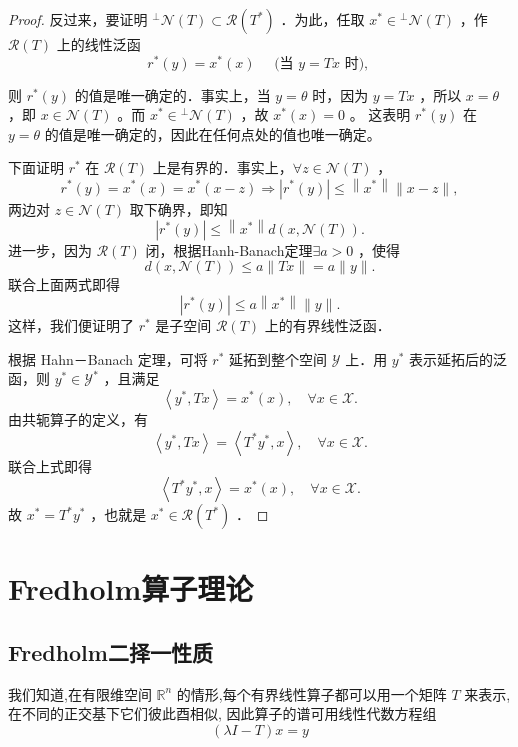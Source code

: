 \documentclass[lang=cn,newtx,10pt,scheme=chinese,thmcnt=chapter]{elegantbook}
\begin{document}
\begin{problemset}
\begin{proof}
反过来，要证明 ${ }^{\perp} \mathcal{N}(T) \subset \mathcal{R}\left(T^*\right)$ ．为此，任取 $x^* \in{ }^{\perp} \mathcal{N}(T)$ ，作 $\mathcal{R}(T)$ 上的线性泛函
$$
r^*(y)=x^*(x) \quad \text { (当 } y=T x \text { 时), }
$$


则 $r^*(y)$ 的值是唯一确定的．事实上，当 $y=\theta$ 时，因为 $y=T x$ ，所以 $x= \theta$ ，即 $x \in \mathcal{N}(T)$ 。而 $x^* \in{ }^{\perp} \mathcal{N}(T)$ ，故 $x^*(x)=0$ 。 这表明 $r^*(y)$ 在 $y=\theta$ 的值是唯一确定的，因此在任何点处的值也唯一确定。

下面证明 $r^*$ 在 $\mathcal{R}(T)$ 上是有界的．事实上，$\forall z \in \mathcal{N}(T)$ ，
$$
r^*(y)=x^*(x)=x^*(x-z) \Longrightarrow\left|r^*(y)\right| \leqslant\left\|x^*\right\|\|x-z\|,
$$
两边对 $z \in \mathcal{N}(T)$ 取下确界，即知
$$
\left|r^*(y)\right| \leqslant\left\|x^*\right\| d(x, \mathcal{N}(T)) .
$$
进一步，因为 $\mathcal{R}(T)$ 闭，根据Hanh-Banach定理$\exists a>0$ ，使得
$$
d(x, \mathcal{N}(T)) \leqslant a\|T x\|=a\|y\| .
$$
联合上面两式即得
$$
\left|r^*(y)\right| \leqslant a\left\|x^*\right\|\|y\| .
$$
这样，我们便证明了 $r^*$ 是子空间 $\mathcal{R}(T)$ 上的有界线性泛函．

根据 Hahn－Banach 定理，可将 $r^*$ 延拓到整个空间 $\mathcal{Y}$ 上．用 $y^*$ 表示延拓后的泛函，则 $y^* \in \mathcal{Y}^*$ ，且满足
$$
\left\langle y^*, T x\right\rangle=x^*(x), \quad \forall x \in \mathcal{X} .
$$
由共轭算子的定义，有
$$
\left\langle y^*, T x\right\rangle=\left\langle T^* y^*, x\right\rangle, \quad \forall x \in \mathcal{X} .
$$
联合上式即得
$$
\left\langle T^* y^*, x\right\rangle=x^*(x), \quad \forall x \in \mathcal{X} .
$$
故 $x^*=T^* y^*$ ，也就是 $x^* \in \mathcal{R}\left(T^*\right)$ ．
\end{proof}

\end{problemset}



\section{Fredholm算子理论}

\subsection{Fredholm二择一性质}

我们知道,在有限维空间 \({\mathbb{R}}^{n}\) 的情形,每个有界线性算子都可以用一个矩阵 \(T\) 来表示, 在不同的正交基下它们彼此酉相似, 因此算子的谱可用线性代数方程组
\begin{equation*}
\left( {{\lambda I} - T}\right) x = y \label{4.15}
\end{equation*}
\end{document}
